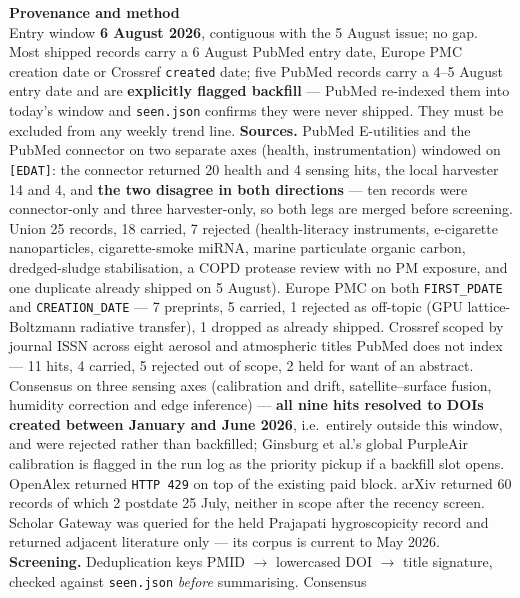 \documentclass[10pt]{article}
\begin{document}
\vspace{4mm}
\begin{keybox}
{\sffamily\bfseries\footnotesize\color{Deep}Provenance and method}\\[1.2mm]
{\fontsize{7.2}{8.8}\selectfont
Entry window \textbf{6 August 2026}, contiguous with the 5 August issue; no gap. Most
shipped records carry a 6 August PubMed entry date, Europe PMC creation date or Crossref
\texttt{created} date; five PubMed records carry a 4--5 August entry date and are
\textbf{explicitly flagged backfill} --- PubMed re-indexed them into today's window and
\texttt{seen.json} confirms they were never shipped. They must be excluded from any
weekly trend line.
\textbf{Sources.} PubMed E-utilities and the PubMed connector on two separate axes
(health, instrumentation) windowed on \texttt{[EDAT]}: the connector returned 20 health
and 4 sensing hits, the local harvester 14 and 4, and \textbf{the two disagree in both
directions} --- ten records were connector-only and three harvester-only, so both legs are
merged before screening. Union 25 records, 18 carried, 7 rejected (health-literacy
instruments, e-cigarette nanoparticles, cigarette-smoke miRNA, marine particulate organic
carbon, dredged-sludge stabilisation, a COPD protease review with no PM exposure, and one
duplicate already shipped on 5 August). Europe PMC on both \texttt{FIRST\_PDATE} and
\texttt{CREATION\_DATE} --- 7 preprints, 5 carried, 1 rejected as off-topic
(GPU lattice-Boltzmann radiative transfer), 1 dropped as already shipped. Crossref scoped
by journal ISSN across eight aerosol and atmospheric titles PubMed does not index ---
11 hits, 4 carried, 5 rejected out of scope, 2 held for want of an abstract. Consensus on
three sensing axes (calibration and drift, satellite--surface fusion, humidity correction
and edge inference) --- \textbf{all nine hits resolved to DOIs created between January and
June 2026}, i.e.\ entirely outside this window, and were rejected rather than backfilled;
Ginsburg et al.'s global PurpleAir calibration is flagged in the run log as the priority
pickup if a backfill slot opens. OpenAlex returned \texttt{HTTP 429} on top of the
existing paid block. arXiv returned 60 records of which 2 postdate 25 July, neither in
scope after the recency screen. Scholar Gateway was queried for the held Prajapati
hygroscopicity record and returned adjacent literature only --- its corpus is current to
May 2026.
\textbf{Screening.} Deduplication keys PMID $\rightarrow$ lowercased DOI $\rightarrow$
title signature, checked against \texttt{seen.json} \emph{before} summarising. Consensus
}
\end{keybox}
\end{document}
